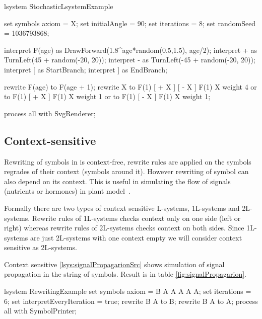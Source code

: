 \begin{Lsystem}[label=lsys:randExample,caption={Example of stochastic \lsystem with randomized rewrite rules and interpretation}]
lsystem StochasticLsystemExample {
	set symbols axiom = X;
	set initialAngle = 90;
	set iterations = 8;
	set randomSeed = 1036793868;

	interpret F(age) as DrawForward(1.8^age*random(0.5,1.5), age/2);
	interpret + as TurnLeft(45 + random(-20, 20));
	interpret - as TurnLeft(-45 + random(-20, 20));
	interpret [ as StartBranch;
	interpret ] as EndBranch;

	rewrite F(age) to F(age + 1);
	rewrite X
		to F(1) [ + X ] [ - X ] F(1) X  weight 4 or
		to F(1) [ + X ]         F(1) X  weight 1 or
		to F(1)         [ - X ] F(1) X  weight 1;
}
process all with SvgRenderer;
\end{Lsystem}


\subsection{Context-sensitive \lsystems}

\newcommand{\onelsystems}{\mbox{1L-systems}\xspace}
\newcommand{\twolsystems}{\mbox{2L-systems}\xspace}

Rewriting of symbols in \zerolsystems is context-free, rewrite rules are applied on the symbols regrades of their context (symbols around it).
However rewriting of symbol can also depend on its context.
This is useful in simulating the flow of signals (nutrients or hormones) in plant model~\citep{PL91}.

Formally there are two types of context sensitive L-systems, \onelsystems and \twolsystems.
Rewrite rules of \onelsystems checks context only on one side (left or right) whereas rewrite rules of \twolsystems checks context on both sides.
Since \onelsystems are just \twolsystems with one context empty we will consider context sensitive \lsystems as \twolsystems.

Context sensitive \lsystem \ref{lsys:signalPropagarionSrc} shows simulation of signal propagation in the string of symbols.
Result is in table \ref{fig:signalPropagarion}.

\begin{Lsystem}[label=lsys:signalPropagarionSrc,caption={Context-sensitive \lsystems simulating signal propagation}]
lsystem RewritingExample {
	set symbols axiom = B A A A A A;
	set iterations = 6;
	set interpretEveryIteration = true;
	rewrite {B} A     to B;
	rewrite     B {A} to A;
}
process all with SymbolPrinter;
\end{Lsystem}

